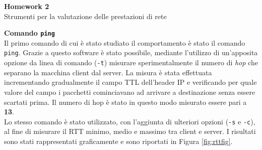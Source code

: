 \documentclass[a4paper,10pt]{article}
\begin{document}
\begin{center}
\Large
\noindent
\textbf{Homework 2}\\
\normalsize
Strumenti per la valutazione delle prestazioni di rete\\
\end{center}
\noindent
\textbf{Comando \texttt{ping}}\\
Il primo comando di cui è stato studiato il comportamento è stato il comando \texttt{ping}. Grazie a questo software è stato possibile, mediante l'utilizzo di un'apposita opzione da linea di comando (\texttt{-t}) misurare sperimentalmente il numero di \textit{hop} che separano la macchina client dal server. La misura è stata effettuata incrementando gradualmente il campo TTL dell'header IP e verificando per quale valore del campo i pacchetti cominciavano ad arrivare a destinazione senza essere scartati prima. Il numero di hop è stato in questo modo misurato essere pari a \textbf{13}.\\

\noindent
Lo stesso comando è stato utilizzato, con l'aggiunta di ulteriori opzioni (\texttt{-s} e \texttt{-c}), al fine di misurare il RTT minimo, medio e massimo tra client e server. I risultati sono stati rappresentati graficamente e sono riportati in Figura \ref{fig:rttfig}.
\end{document}
